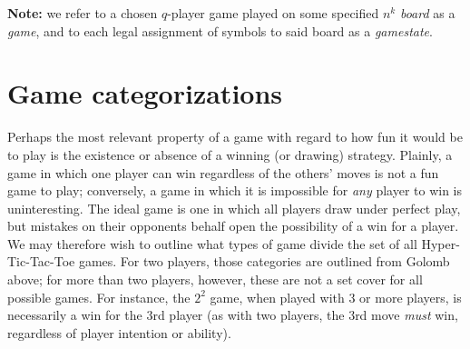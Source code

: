 \documentclass[english, 11pt]{article}
\begin{document}
\textbf{Note:} we refer to a chosen $q$-player game played on some specified $n^k$ \textit{board} as a \textit{game}, and to each legal assignment of symbols to said board as a \textit{gamestate}.


\section*{Game categorizations}

Perhaps the most relevant property of a game with regard to how fun it would be to play is the existence or absence of a winning (or drawing) strategy. Plainly, a game in which one player can win regardless of the others' moves is not a fun game to play; conversely, a game in which it is impossible for \textit{any} player to win is uninteresting. The ideal game is one in which all players draw under perfect play, but mistakes on their opponents behalf open the possibility of a win for a player. 
We may therefore wish to outline what types of game divide the set of all Hyper-Tic-Tac-Toe games. For two players, those categories are outlined from Golomb above; for more than two players, however, these are not a set cover for all possible games. For instance, the $2^2$ game, when played with 3 or more players, is necessarily a win for the 3rd player (as with two players, the 3rd move \textit{must} win, regardless of player intention or ability).
\end{document}
